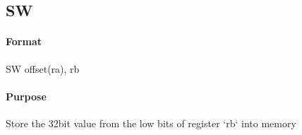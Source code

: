 \subsection{SW}


\paragraph{Format} SW offset(ra), rb

\paragraph{Purpose} Store the 32bit value from the low bits of register `rb` into memory
